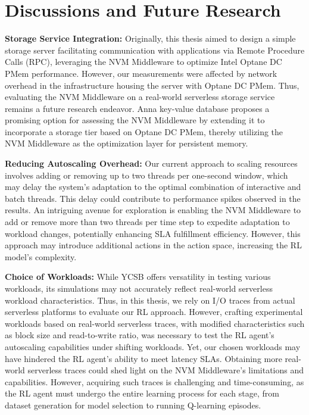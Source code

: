 \chapter{Discussions and Future Research}

\textbf{Storage Service Integration:} Originally, this thesis aimed to design a simple storage server facilitating communication with applications via Remote Procedure Calls (RPC), leveraging the NVM Middleware to optimize Intel Optane DC PMem performance. However, our measurements were affected by network overhead in the infrastructure housing the server with Optane DC PMem. Thus, evaluating the NVM Middleware on a real-world serverless storage service remains a future research endeavor. Anna key-value database \cite{wu2019anna} proposes a promising option for assessing the NVM Middleware by extending it to incorporate a storage tier based on Optane DC PMem, thereby utilizing the NVM Middleware as the optimization layer for persistent memory.

\textbf{Reducing Autoscaling Overhead:} Our current approach to scaling resources involves adding or removing up to two threads per one-second window, which may delay the system's adaptation to the optimal combination of interactive and batch threads. This delay could contribute to performance spikes observed in the results. An intriguing avenue for exploration is enabling the NVM Middleware to add or remove more than two threads per time step to expedite adaptation to workload changes, potentially enhancing SLA fulfillment efficiency. However, this approach may introduce additional actions in the action space, increasing the RL model's complexity.

\textbf{Choice of Workloads:} While YCSB offers versatility in testing various workloads, its simulations may not accurately reflect real-world serverless workload characteristics. Thus, in this thesis, we rely on I/O traces from actual serverless platforms to evaluate our RL approach. However, crafting experimental workloads based on real-world serverless traces, with modified characteristics such as block size and read-to-write ratio, was necessary to test the RL agent's autoscaling capabilities under shifting workloads. Yet, our chosen workloads may have hindered the RL agent's ability to meet latency SLAs. Obtaining more real-world serverless traces could shed light on the NVM Middleware's limitations and capabilities. However, acquiring such traces is challenging and time-consuming, as the RL agent must undergo the entire learning process for each stage, from dataset generation for model selection to running Q-learning episodes.

